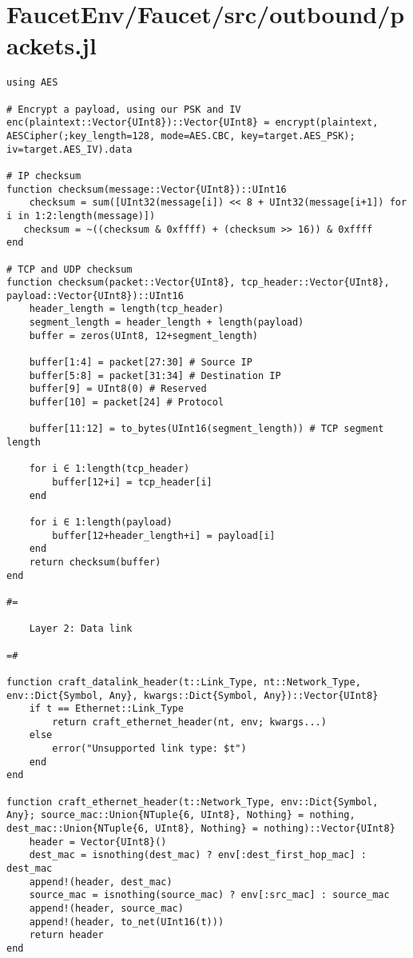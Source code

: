 \section{FaucetEnv/Faucet/src/outbound/packets.jl}
\begin{lstlisting}[language=JuliaLocal, style=julia]
using AES

# Encrypt a payload, using our PSK and IV
enc(plaintext::Vector{UInt8})::Vector{UInt8} = encrypt(plaintext, AESCipher(;key_length=128, mode=AES.CBC, key=target.AES_PSK); iv=target.AES_IV).data

# IP checksum
function checksum(message::Vector{UInt8})::UInt16
    checksum = sum([UInt32(message[i]) << 8 + UInt32(message[i+1]) for i in 1:2:length(message)])
   checksum = ~((checksum & 0xffff) + (checksum >> 16)) & 0xffff
end

# TCP and UDP checksum
function checksum(packet::Vector{UInt8}, tcp_header::Vector{UInt8}, payload::Vector{UInt8})::UInt16
    header_length = length(tcp_header)
    segment_length = header_length + length(payload)
    buffer = zeros(UInt8, 12+segment_length)

    buffer[1:4] = packet[27:30] # Source IP
    buffer[5:8] = packet[31:34] # Destination IP
    buffer[9] = UInt8(0) # Reserved 
    buffer[10] = packet[24] # Protocol
    
    buffer[11:12] = to_bytes(UInt16(segment_length)) # TCP segment length

    for i ∈ 1:length(tcp_header)
        buffer[12+i] = tcp_header[i]
    end

    for i ∈ 1:length(payload)
        buffer[12+header_length+i] = payload[i]
    end     
    return checksum(buffer)
end

#=

    Layer 2: Data link

=#

function craft_datalink_header(t::Link_Type, nt::Network_Type, env::Dict{Symbol, Any}, kwargs::Dict{Symbol, Any})::Vector{UInt8}
    if t == Ethernet::Link_Type
        return craft_ethernet_header(nt, env; kwargs...)
    else
        error("Unsupported link type: $t")
    end
end

function craft_ethernet_header(t::Network_Type, env::Dict{Symbol, Any}; source_mac::Union{NTuple{6, UInt8}, Nothing} = nothing, dest_mac::Union{NTuple{6, UInt8}, Nothing} = nothing)::Vector{UInt8}
    header = Vector{UInt8}()
    dest_mac = isnothing(dest_mac) ? env[:dest_first_hop_mac] : dest_mac
    append!(header, dest_mac)
    source_mac = isnothing(source_mac) ? env[:src_mac] : source_mac
    append!(header, source_mac)
    append!(header, to_net(UInt16(t)))
    return header
end


\end{lstlisting}
